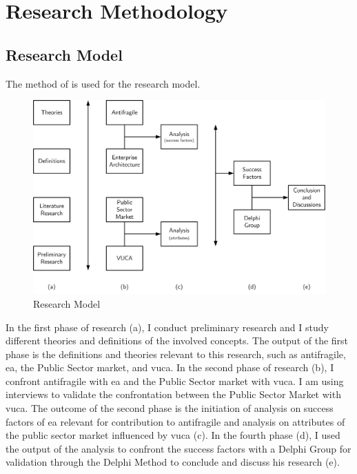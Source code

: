 \chapter{Research Methodology}
\label{ch:research-methodology}

\section{Research Model}
\label{sec:research-model}
The method of \textcite{Verschuren2016} is used for the research model.
	\begin{figure}[h]
		\centering
		\includegraphics[width=12cm]{images/research-model.png}
		\caption[Research Model]{Research Model}
		\label{fig:research-model}
	\end{figure}

In the first phase of research (a), I conduct preliminary research and I study different theories and definitions of the involved concepts. The output of the first phase is the definitions and theories relevant to this research, such as \gls{antifragile}, \acrlong{ea}, the Public Sector market, and \acrshort{vuca}. In the second phase of research (b), I confront \gls{antifragile} with \acrlong{ea} and the Public Sector market with \acrshort{vuca}. I am using interviews to validate the confrontation between the Public Sector Market with \acrshort{vuca}. The outcome of the second phase is the initiation of analysis on success factors of \acrlong{ea} relevant for contribution to \gls{antifragile} and analysis on attributes of the public sector market influenced by \acrshort{vuca} (c). In the fourth phase (d), I used the output of the analysis to confront the success factors with a Delphi Group for validation through the Delphi Method to conclude and discuss his research (e).

